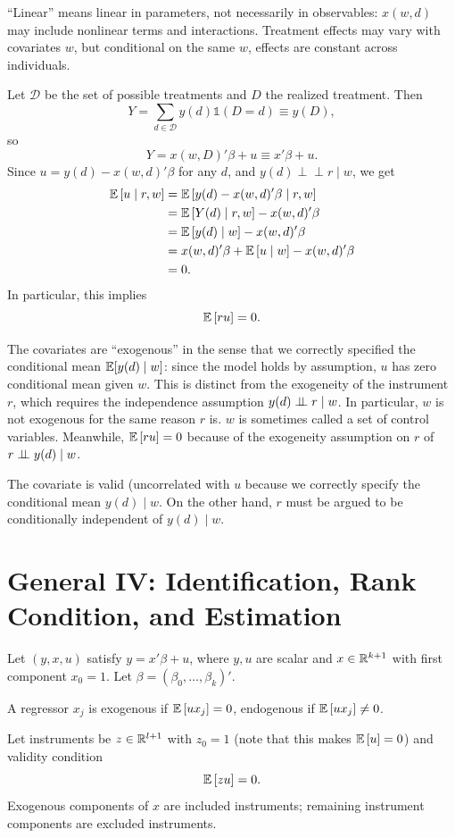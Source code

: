 \begin{remark}[Interpretation]
	``Linear'' means linear in parameters, not necessarily in observables: $x(w,d)$ may include nonlinear terms and interactions. Treatment effects may vary with covariates $w$, but conditional on the same $w$, effects are constant across individuals.
\end{remark}

\begin{proposition}
	Let $\mathcal{D}$ be the set of possible treatments and $D$ the realized treatment. Then \[
		Y = \sum_{d \in \mathcal{D}} y(d)\mathds{1}(D=d) \equiv y(D)
	,\]
	so \[
		Y = x(w,D)'\beta + u \equiv x'\beta + u
	.\]
	Since $u=y(d)-x(w,d)'\beta$ for any $d$, and $y(d) \perp\!\!\!\perp r \mid w$, we get
	\begin{align*}
		\mathbb{E}\left[u \mid r,w\right] 
		&= \mathbb{E}\left[y (d) - x(w,d)' \beta \mid r,w\right]  \\
		&= \mathbb{E}\left[Y(d) \mid r,w\right] - x(w,d)'\beta \\
		&= \mathbb{E}\left[y(d) \mid w\right]  - x(w,d)'\beta \\
		&= x(w,d)'\beta + \mathbb{E}\left[ u \mid w\right] - x(w,d)'\beta \\
		&= 0
	.\end{align*}
	In particular, this implies \[
		\mathbb{E}\left[ru\right]=0
	.\]

	The covariates are ``exogenous'' in the sense that we correctly specified the conditional mean $\mathbb{E}[y(d)\mid w]$: since the model holds by assumption, $u$ has zero conditional mean given $w$. This is distinct from the exogeneity of the instrument $r$, which requires the independence assumption $y(d) \perp\!\!\!\perp r \mid w$. In particular, $w$ is not exogenous for the same reason $r$ is. $w$ is sometimes called a set of control variables.
	Meanwhile, $\mathbb{E}\left[ru\right] = 0 $ because of the exogeneity assumption on $r$ of $r \perp\!\!\!\perp y(d) \mid w$.

	The covariate is valid (uncorrelated with $u$ because we correctly specify the conditional mean $y(d) \mid w$. On the other hand, $r$ must be argued to be conditionally independent of $y(d) \mid w$.
\end{proposition}

\section{General IV: Identification, Rank Condition, and Estimation}

\begin{definition}
	Let $(y,x,u)$ satisfy $y=x'\beta+u$, where $y,u$ are scalar and $x\in\mathbb{R}^{k+1}$ with first component $x_0=1$. Let $\beta=(\beta_0,\ldots,\beta_k)'$.

	A regressor $x_j$ is exogenous if $\mathbb{E}\left[ux_j\right]=0$, endogenous if $\mathbb{E}\left[ux_j\right]\ne 0$.

	Let instruments be $z\in\mathbb{R}^{l+1}$ with $z_0=1$ (note that this makes $\mathbb{E}\left[u \right] =0$) and validity condition \[
		\mathbb{E}\left[zu\right]=0
	.\]
	Exogenous components of $x$ are included instruments; remaining instrument components are excluded instruments.
\end{definition}

